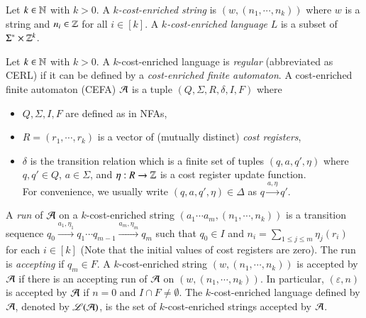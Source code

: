 

Let $k \in \mathbb{N}$ with $k > 0$. A \emph{$k$-cost-enriched string} is $(w, (n_1, \cdots, n_k))$ where $w$ is a string and $n_i \in \mathbb{Z}$ for all $i \in [k]$. 
A \emph{$k$-cost-enriched language} $L$ is a subset of $\Sigma^* \times \mathbb{Z}^k$. 

\begin{definition}
Let $k \in \mathbb{N}$ with $k > 0$. A $k$-cost-enriched language is \emph{regular} (abbreviated as CERL) if it can be defined by a \emph{cost-enriched finite automaton}. A cost-enriched finite automaton (CEFA) $\mathcal{A}$ is a tuple $(Q, \Sigma, R, \delta, I, F)$ where 
\begin{itemize}
\item $Q, \Sigma, I, F$ are defined as in NFAs, 
%
\item $R=(r_1, \cdots, r_k)$ is a vector of (mutually distinct) \emph{cost registers}, 
%
\item $\delta$ is the transition relation which is a finite set of tuples $(q, a, q', \eta)$ where $q, q' \in Q$, $a \in \Sigma$, and $\eta: R \rightarrow \mathbb{Z}$ is a cost register update function. \\
For convenience, we usually write $(q, a, q', \eta) \in \Delta$ as $q \xrightarrow{a, \eta} q'$.
\end{itemize}
%
A \emph{run} of $\mathcal{A}$ on a $k$-cost-enriched string $(a_1 \cdots a_m, (n_1, \cdots,n_k))$ is a  transition sequence $q_0 \xrightarrow{a_1, \eta_1} q_1 \cdots q_{m-1} \xrightarrow{a_m, \eta_m} q_m$ such that $q_0 \in I$ and $n_i = \sum \limits_{1\leq j\leq m}\eta_j(r_i)$ for each $i \in [k]$ (Note that the initial values of cost registers are zero). The run is \emph{accepting} if $q_m \in F$. A $k$-cost-enriched string $(w, (n_1, \cdots,n_k))$ is accepted by $\mathcal{A}$ if there is an accepting run of $\mathcal{A}$ on $(w, (n_1, \cdots,n_k))$. In particular, $(\varepsilon, n)$ is accepted by $\mathcal{A}$ if $n=0$ and $I\cap F \neq \emptyset$.
The $k$-cost-enriched language defined by $\mathcal{A}$, denoted by $\mathscr{L}(\mathcal{A})$, is the set of $k$-cost-enriched strings accepted by $\mathcal{A}$. 
\end{definition}


